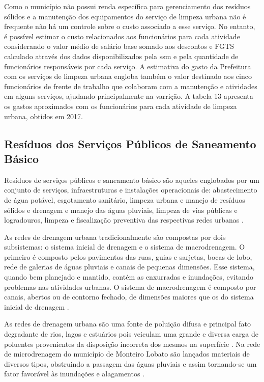 	Como o município não possui renda específica para gerenciamento dos resíduos sólidos e a manutenção dos equipamentos do serviço de limpeza urbana não é frequente não há um controle sobre o custo associado a esse serviço. No entanto, é possível estimar o custo relacionados aos funcionários para cada atividade considerando o valor médio de salário base somado aos descontos e FGTS calculado através dos dados disponibilizados pela \gls{ssm} e pela quantidade de funcionários responsáveis por cada serviço. A estimativa do gasto da Prefeitura com os serviços de limpeza urbana engloba também o valor destinado aos cinco funcionários de frente de trabalho que colaboram com a manutenção e atividades em alguns serviços, ajudando principalmente na varrição.  A tabela 13 apresenta os gastos aproximados com os funcionários para cada atividade de limpeza urbana, obtidos em 2017.
	
%	
	
	\subsection{Resíduos dos Serviços Públicos de Saneamento Básico}
	
	Resíduos de serviços públicos e saneamento básico são aqueles englobados por um conjunto de serviços, infraestruturas e instalações operacionais de: abastecimento de água potável, esgotamento sanitário, limpeza urbana e manejo de resíduos sólidos e drenagem e manejo das águas pluviais, limpeza de vias públicas e logradouros, limpeza e fiscalização preventiva das respectivas redes urbanas \cite{brasil:12305}.  
	
	As redes de drenagem urbana tradicionalmente são compostas por dois subsistemas: o sistema inicial de drenagem e o sistema de macrodrenagem. O primeiro é composto pelos pavimentos das ruas, guias e sarjetas, bocas de lobo, rede de galerias de águas pluviais e canais de pequenas dimensões. Esse sistema, quando bem planejado e mantido, contém as enxurradas e inundações, evitando problemas nas atividades urbanas. O sistema de macrodrenagem é composto por canais, abertos ou de contorno fechado, de dimensões maiores que os do sistema inicial de drenagem \cite{Ramos:1999}.
	
	As redes de drenagem urbana são uma fonte de poluição difusa e principal fato degradante de rios, lagos e estuários pois veiculam uma grande e diversa carga de poluentes provenientes da disposição incorreta dos mesmos na superfície \cite{Brites2004}. Na rede de microdrenagem do município de Monteiro Lobato são lançados materiais de diversos tipos, obstruindo a passagem das águas pluviais e assim tornando-se um fator favorável às inundações e alagamentos \cite{MonteiroLobato}.
 	
